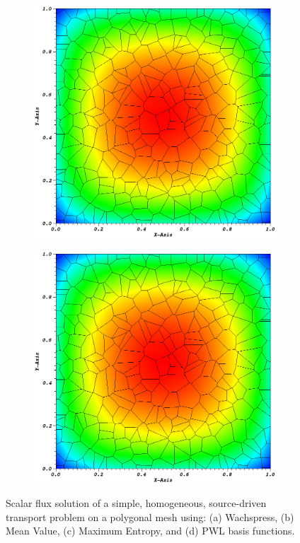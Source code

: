 \documentclass[11pt]{article}
\begin{document}
\begin{figure}
	\vspace{4mm}
	
	\begin{subfigure}[b]{0.48\textwidth}
		\centering
		\includegraphics[width=\textwidth]{figures/poly_flux_Max_Ent.png}
		\caption{}
	\end{subfigure}
	\hfill
	\begin{subfigure}[b]{0.48\textwidth}
		\centering
		\includegraphics[width=\textwidth]{figures/poly_flux_PWL.png}
		\caption{}
	\end{subfigure}
\caption{Scalar flux solution of a simple, homogeneous, source-driven transport problem on a polygonal mesh using: (a) Wachspress, (b) Mean Value, (c) Maximum Entropy, and (d) PWL basis functions.}
\label{fig::poly_flux}
\end{figure}
\end{document}
